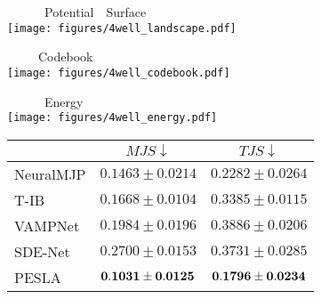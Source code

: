 \begin{minipage}{0.66\textwidth}
    \footnotesize    \subcaption{~~~~~~~~~~~~~~~~~~~~~~~~~~~~~~~~~~~~~~~~~~~~~~~~~~~~~~~~~~~~~~~~~~~~~~~~~~~~~~~~~~~~~~~~~~~~~~~~~~~~~~~~~~~~~~~~~~~~~~~~~~~~~~~~}\label{fig:prinz_data}
    \begin{minipage}{\textwidth}
    
        \begin{minipage}{0.32\textwidth}
            \centering ~~~~~~Potential~~Surface\\
            \texttt{[image: figures/4well\_landscape.pdf]}
        \end{minipage}
        \begin{minipage}{0.32\textwidth}
            \centering ~~~~~Codebook\\
            \texttt{[image: figures/4well\_codebook.pdf]}
        \end{minipage}
         \begin{minipage}{0.32\textwidth}
            \centering ~~~~~~Energy\\
            \texttt{[image: figures/4well\_energy.pdf]}
        \end{minipage}
        
    \end{minipage}
    
    \begin{minipage}{\textwidth}
        \setlength{\tabcolsep}{8pt}
        \renewcommand{\arraystretch}{1.2} %
        \fontsize{8}{15}
        \centering        \subcaption{~~~~~~~~~~~~~~~~~~~~~~~~~~~~~~~~~~~~~~~~~~~~~~~~~~~~~~~~~~~~~~~~~~~~~~~~~~~~~~~~~~~~~~~~~~~~~~~~~~~~~~~~~~~~~~~~~~~~~~~~~~~~~~~~}\label{tab:prinz_results}
        \begin{tabular}{l|cc}
            \hline
             & $MJS \downarrow$ & $TJS \downarrow$ \\
            \hline
            NeuralMJP & $0.1463\pm0.0214$ &  $0.2282\pm0.0264$ \\
            T-IB &  $0.1668\pm0.0104$  & $0.3385\pm0.0115$  \\
            VAMPNet & $0.1984\pm0.0196$  & $0.3886\pm0.0206$ \\
            SDE-Net & $0.2700\pm0.0153$  & $0.3731\pm0.0285$ \\
            PESLA & $\bf{0.1031\pm0.0125}$ &  $\bf{0.1796\pm0.0234}$
            \\\hline           
        \end{tabular}
        
    \end{minipage}

\end{minipage}
